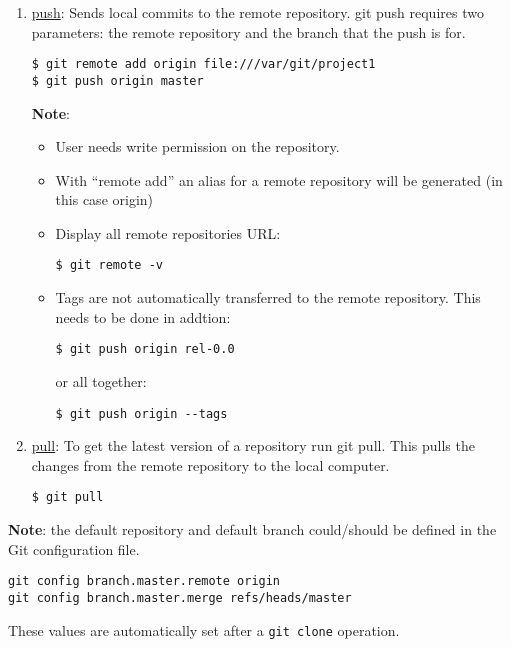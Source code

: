 \begin{enumerate}
\newslide
\item \underline{push}: Sends local commits to the remote repository. git push requires two parameters: the remote repository and the branch that the push is for.
  \begin{lstlisting}
$ git remote add origin file:///var/git/project1
$ git push origin master
  \end{lstlisting}
{\bfseries Note}:
\begin{itemize}
\item User needs write permission on the repository.
\item With ``remote add'' an alias for a remote repository will be generated (in this case origin)
\item Display all remote repositories URL:
  \begin{lstlisting}
$ git remote -v
  \end{lstlisting}
\item Tags are not automatically transferred to the remote repository. This
needs to be done in addtion:
  \begin{lstlisting}
$ git push origin rel-0.0
  \end{lstlisting}
or all together:
\begin{lstlisting}
$ git push origin --tags
\end{lstlisting}
\end{itemize}
%
\item \underline{pull}: To get the latest version of a repository run git pull. This pulls the changes from the remote repository to the local computer.
  \begin{lstlisting}
$ git pull
\end{lstlisting}
\end{enumerate}
{\bfseries Note}:
the default repository and default branch could/should be defined in the
Git configuration file.
  \begin{lstlisting}
git config branch.master.remote origin
git config branch.master.merge refs/heads/master
  \end{lstlisting}
These values are automatically set after a \verb|git clone| operation.
%
